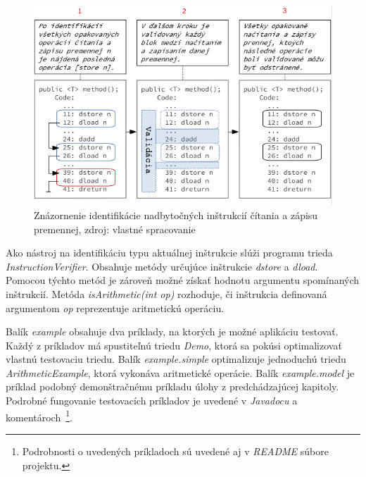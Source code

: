 \documentclass[11pt,final,oneside]{fithesis}
\begin{document}
\begin{figure}[h]
  \centering
   \includegraphics[width=\textwidth]{identification.png}
  \caption{Znázornenie identifikácie nadbytočných inštrukcií čítania a zápisu 
  premennej, zdroj: vlastné spracovanie}
  \label{fig:identify}
\end{figure}

Ako nástroj na identifikáciu typu aktuálnej inštrukcie slúži programu trieda 
\textit{InstructionVerifier}. Obsahuje metódy určujúce inštrukcie 
\textit{dstore} a \textit{dload}. Pomocou týchto metód je zároveň možné získať 
hodnotu argumentu spomínaných inštrukcií. Metóda \textit{isArithmetic(int op)} 
rozhoduje, či inštrukcia definovaná argumentom \textit{op} reprezentuje 
aritmetickú operáciu.

Balík \textit{example} obsahuje dva príklady, na ktorých je možné aplikáciu 
testovať. Každý z príkladov má spustiteľnú triedu \textit{Demo}, ktorá sa 
pokúsi optimalizovať vlastnú testovaciu triedu. Balík \textit{example.simple} 
optimalizuje jednoduchú triedu \textit{ArithmeticExample}, ktorá vykonáva 
aritmetické operácie. Balík \textit{example.model} je príklad podobný 
demonštračnému príkladu úlohy z predchádzajúcej kapitoly. Podrobné fungovanie 
testovacích príkladov je uvedené v \textit{Javadocu} a
komentároch~\footnote{Podrobnosti o uvedených príkladoch sú uvedené aj
v \textit{README} súbore projektu.}.
\end{document}
